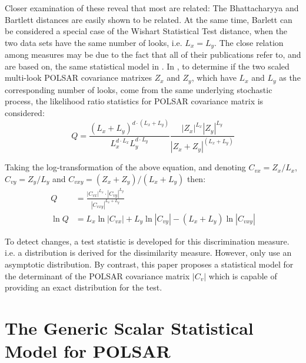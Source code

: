 \documentclass[]{tRSL2e}
\begin{document}
Closer examination of these reveal that most are related:
The Bhattacharyya and Bartlett distances are easily shown to be related.
At the same time, Barlett can be considered a special case of the Wishart Statistical Test distance,
  when the two data sets have the same number of looks, i.e. $L_x=L_y$.
The close relation among  measures may be due to the fact that
  all of their publications refer to, and are based on, the same statistical model in \citep{Conradsen_2003_TGRS_4}.
In \citep{Conradsen_2003_TGRS_4}, to determine if the two scaled multi-look POLSAR covariance matrixes $Z_x$ and $Z_y$,
  which have $L_x$ and $L_y$ as the corresponding number of looks,
  come from the same underlying stochastic process,
the likelihood ratio statistics for POLSAR covariance matrix is considered:  
     \vspace{-2mm}
\begin{equation}
  Q = \frac{(L_x+L_y)^{d \cdot (L_x+L_y)}}{L_x^{d \cdot L_x} L_y^{d \cdot L_y}} \frac{|Z_x|^{L_x} |Z_y|^{L_y} }{|Z_x+Z_y|^{(L_x+L_y)}}
\end{equation}

Taking the log-transformation of the above equation, and denoting $C_{vx} = Z_x / L_x$, $C_{vy} = Z_y / L_y$ and $C_{vxy} = (Z_x + Z_y)/(L_x + L_y)$ then:
{\small
\begin{align}
  Q &= \frac{|C_{vx}|^{L_x} \cdot |C_{vy}|^{L_y} }{|C_{vxy}|^{L_x + L_y}} \label{eqn:ori_likelyhood_stats} \\
  \ln Q &= L_x \ln |C_{vx}| + L_y \ln |C_{vy}| - (L_x + L_y) \ln |C_{vxy}| \label{eqn:log_likelyhood_stats}
\end{align}
}
\vspace{-2mm}

To detect changes, a test statistic is developed for this discrimination measure.
i.e. a distribution is derived for the dissimilarity measure.
However, \citet{Conradsen_2003_TGRS_4} only use an asymptotic distribution.
By contrast, this paper proposes a statistical model for the determinant of the POLSAR covariance matrix $|C_v|$
  which is capable of providing an exact distribution for the test.

\section{The Generic Scalar Statistical Model for POLSAR}  
\label{sec:theoretical_model}
\end{document}
